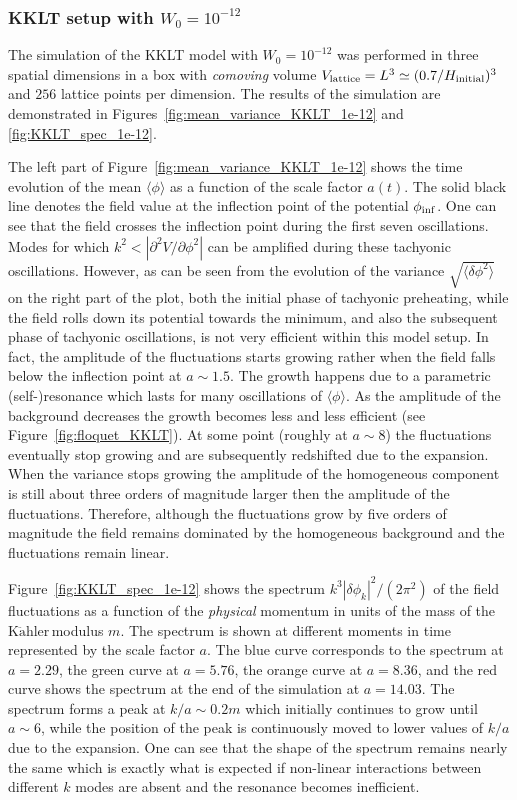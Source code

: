 \documentclass[12pt]{article}
\newcommand{\Kahler}{\ensuremath{\text{K}\ddot{\text{a}}\text{hler}\,}}
\begin{document}
\subsubsection*{KKLT setup with $W_0=10^{-12}$}
\label{sec:KKLT_1e-12}

The simulation of the KKLT model with $W_0=10^{-12}$ was performed in three spatial dimensions in a box with \textit{comoving} volume $V_{\rm lattice} = L^3 \simeq (0.7/H_{\rm initial})^3$ and $256$ lattice points per dimension. The results of the simulation are demonstrated in Figures~\ref{fig:mean_variance_KKLT_1e-12} and \ref{fig:KKLT_spec_1e-12}. 

The left part of Figure~\ref{fig:mean_variance_KKLT_1e-12} shows the time evolution of the mean $\langle\phi\rangle$ as a function of the scale factor $a(t)$. The solid black line denotes the field value  at the inflection point of the potential $\phi_{\rm inf}$. One can see that the field crosses the inflection point during the first seven oscillations. Modes for which $k^2<|\partial^2V/\partial\phi^2|$ can be amplified during these tachyonic oscillations. However, as can be seen from the evolution of the variance $\sqrt{\langle\delta\phi^2\rangle}$ on the right part of the plot, both the initial phase of tachyonic preheating, while the field rolls down its potential towards the minimum, and also the subsequent phase of tachyonic oscillations, is not very efficient within this model setup. In fact, the amplitude of the fluctuations starts growing rather when the field falls below the inflection point at $a\sim1.5$. The growth happens due to a parametric (self-)resonance which lasts for many oscillations of $\langle\phi\rangle$. As the amplitude of the background decreases the growth becomes less and less efficient (see Figure~\ref{fig:floquet_KKLT}). At some point (roughly at $a\sim8$) the fluctuations eventually stop growing and are subsequently redshifted due to the expansion. When the variance stops growing the amplitude of the homogeneous component is still about three orders of magnitude larger then the amplitude of the fluctuations. Therefore, although the fluctuations grow by five orders of magnitude the field remains dominated by the homogeneous background and the fluctuations remain linear. 

Figure~\ref{fig:KKLT_spec_1e-12} shows the spectrum $k^3|\delta\phi_k|^2/(2\pi^2)$ of the field fluctuations as a function of the \textit{physical} momentum in units of the mass of the \Kahler modulus $m$. The spectrum is shown at different moments in time represented by the scale factor $a$. The blue curve corresponds to the spectrum at $a=2.29$, the green curve at $a=5.76$, the orange curve at $a=8.36$, and the red curve shows the spectrum at the end of the simulation at $a=14.03$. The spectrum forms a peak at $k/a\sim0.2 m$ which initially continues to grow until $a\sim6$, while the position of the peak is continuously moved to lower values of $k/a$ due to the expansion. One can see that the shape of the spectrum remains nearly the same which is exactly what is expected if non-linear interactions between different $k$ modes are absent and the resonance becomes inefficient.
\end{document}
